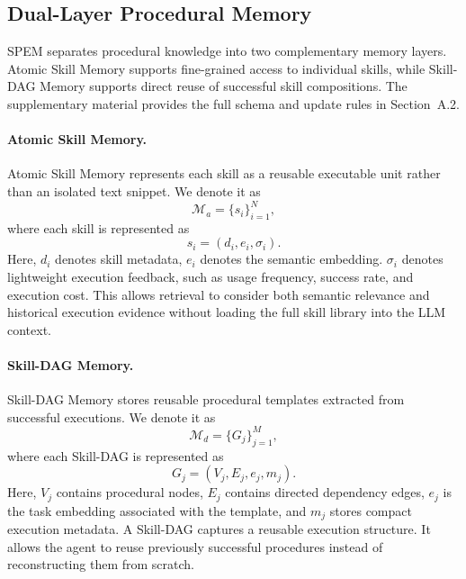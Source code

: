 \documentclass[letterpaper]{article} %
\newcommand{\model}{\textsc{SPEM}}
\begin{document}
\subsection{Dual-Layer Procedural Memory}

\model{} separates procedural knowledge into two complementary memory layers. Atomic Skill Memory supports fine-grained access to individual skills, while Skill-DAG Memory supports direct reuse of successful skill compositions. The supplementary material provides the full schema and update rules in Section~A.2.

\paragraph{Atomic Skill Memory.}
Atomic Skill Memory represents each skill as a reusable executable unit rather
than an isolated text snippet. We denote it as
\begin{equation}
\mathcal{M}_{a}=\{s_i\}_{i=1}^{N},
\end{equation}
where each skill is represented as
\begin{equation}
s_i=(d_i,e_i,\sigma_i).
\end{equation}
Here, $d_i$ denotes skill metadata, $e_i$ denotes the semantic embedding.
$\sigma_i$ denotes lightweight execution feedback, such as usage frequency,
success rate, and execution cost. This allows retrieval to consider both semantic relevance and historical execution evidence without loading the full
skill library into the LLM context.

\paragraph{Skill-DAG Memory.}
Skill-DAG Memory stores reusable procedural templates extracted from successful
executions. We denote it as
\begin{equation}
\mathcal{M}_{d}=\{G_j\}_{j=1}^{M},
\end{equation}
where each Skill-DAG is represented as
\begin{equation}
G_j=(V_j,E_j,e_j,m_j).
\end{equation}
Here, $V_j$ contains procedural nodes, $E_j$ contains directed dependency edges,
$e_j$ is the task embedding associated with the template, and $m_j$ stores
compact execution metadata. A Skill-DAG captures a reusable execution structure. It allows the agent to reuse previously successful procedures instead of reconstructing them from scratch.
\end{document}
